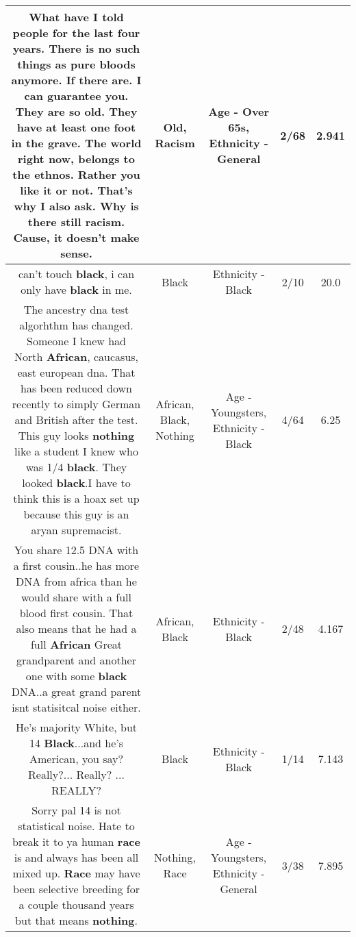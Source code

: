 \documentclass[11pt]{article}
\newlength\mylength
\begin{document}
\begin{center}
\begin{longtable}{|C{.65\mylength}|C{.30\mylength}|C{.12\mylength}|C{.12\mylength}|C{.12\mylength}|}
  \small What have I told people for the last four years. There is no such things as pure bloods anymore. If there are. I can guarantee you. They are so \textbf{old}. They have at least one foot in the grave. The world right now, belongs to the ethnos. Rather you like it or not. That's why I also ask. Why is there still \textbf{racism}. Cause, it doesn't make sense.\normalsize   & Old, Racism & Age - Over 65s, Ethnicity - General & 2/68 & 2.941 \\  \hline
  \small can't touch \textbf{black},  i can only have \textbf{black} in me.\normalsize   & Black & Ethnicity - Black & 2/10 & 20.0 \\  \hline
  \small The ancestry dna test algorhthm has changed. Someone I knew had North \textbf{African}, caucasus, east european dna. That has been reduced down recently to simply German and British after the test. This guy looks \textbf{nothing} like a student I knew who was 1/4 \textbf{black}. They looked \textbf{black}.I have to think this is a hoax set up because this guy is an aryan supremacist.\normalsize   & African, Black, Nothing & Age - Youngsters, Ethnicity - Black & 4/64 & 6.25 \\  \hline
  \small You share 12.5 DNA with a first cousin..he has more DNA from africa than he would share with a full blood first cousin. That also means that he had a full \textbf{African} Great grandparent and another one with some \textbf{black} DNA..a great grand parent isnt statisitcal noise either.\normalsize   & African, Black & Ethnicity - Black & 2/48 & 4.167 \\  \hline
  \small He's majority White, but 14 \textbf{Black}...and he's American, you say? Really?... Really? ... REALLY?\normalsize   & Black & Ethnicity - Black & 1/14 & 7.143 \\  \hline
  \small Sorry pal 14 is not statistical noise. Hate to break it to ya human \textbf{race} is and always has been all mixed up. \textbf{Race} may have been selective breeding for a couple thousand years but that means \textbf{nothing}.\normalsize   & Nothing, Race & Age - Youngsters, Ethnicity - General & 3/38 & 7.895 \\  \hline

\end{longtable}
\end{center}
\end{document}
